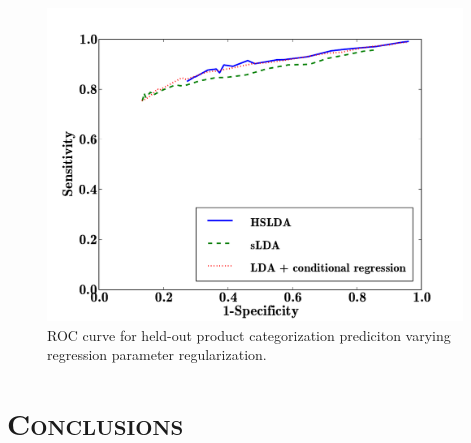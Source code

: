 \documentclass[portrait]{sciposter}
\begin{document}
\begin{multicols}{3}
\begin{multicols}{2}
\begin{figure}
\centering
\includegraphics[width=11cm]{amazon_pred_varying_mu}
\small{\caption{ROC curve for held-out product categorization prediciton varying regression parameter regularization.}}
\label{Amazon_mu_results}
\end{figure}

\end{multicols}


\section{\textsc{Conclusions}}


\end{multicols}
\end{document}
